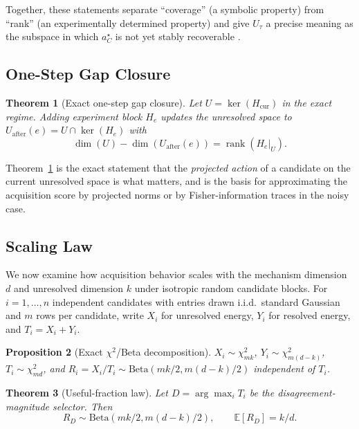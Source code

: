 \documentclass{article}
\newcommand{\rank}{\operatorname{rank}}
\newcommand{\expect}{\mathbb{E}}
\theoremstyle{plain}
\newtheorem{theorem}{Theorem}[section]
\newtheorem{proposition}[theorem]{Proposition}
\theoremstyle{definition}
\theoremstyle{remark}
\begin{document}
Together, these statements separate ``coverage'' (a symbolic property) from
``rank'' (an experimentally determined property) and give $U_\tau$ a precise
meaning as the subspace in which $a^{\star}_C$ is not yet stably recoverable
\citep{hansen1998rank,golub2013matrix,stewart1977perturbation}.

\subsection{One-Step Gap Closure}

\begin{theorem}[Exact one-step gap closure]
\label{thm:gap}
Let $U=\ker(H_{\mathrm{cur}})$ in the exact regime. Adding experiment block
$H_e$ updates the unresolved space to $U_{\mathrm{after}}(e)=U\cap\ker(H_e)$
with
\begin{equation}
\dim(U)-\dim(U_{\mathrm{after}}(e)) = \rank(H_e\vert_U).
\end{equation}
\end{theorem}

Theorem~\ref{thm:gap} is the exact statement that the \emph{projected
action} of a candidate on the current unresolved space is what matters, and
is the basis for approximating the acquisition score by projected norms or
by Fisher-information traces in the noisy case.

\subsection{Scaling Law}

We now examine how acquisition behavior scales with the mechanism dimension
$d$ and unresolved dimension $k$ under isotropic random candidate blocks.
For $i=1,\ldots,n$ independent candidates with entries drawn i.i.d.\
standard Gaussian and $m$ rows per candidate, write $X_i$ for unresolved
energy, $Y_i$ for resolved energy, and $T_i=X_i+Y_i$.

\begin{proposition}[Exact $\chi^2$/Beta decomposition]
$X_i\sim\chi^2_{mk}$, $Y_i\sim\chi^2_{m(d-k)}$, $T_i\sim\chi^2_{md}$, and
$R_i\!=\!X_i/T_i\sim\mathrm{Beta}(mk/2, m(d-k)/2)$ independent of $T_i$.
\end{proposition}

\begin{theorem}[Useful-fraction law]
\label{thm:useful-frac}
Let $D=\arg\max_i T_i$ be the disagreement-magnitude selector. Then
\[
R_D \sim \mathrm{Beta}(mk/2,m(d-k)/2), \qquad \expect[R_D] = k/d.
\]
\end{theorem}
\end{document}
